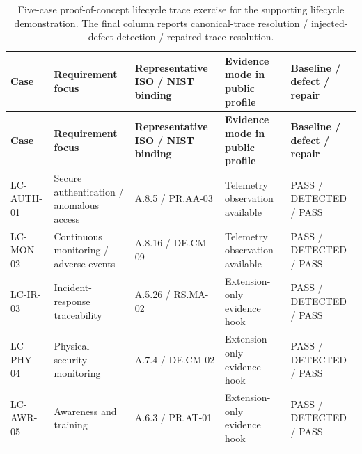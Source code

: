 \begingroup
\scriptsize
\setlength{\tabcolsep}{2.1pt}
\renewcommand{\arraystretch}{1.08}
\begin{longtable}{>{\raggedright\arraybackslash}p{1.7cm}>{\raggedright\arraybackslash}p{3.0cm}>{\raggedright\arraybackslash}p{2.3cm}>{\raggedright\arraybackslash}p{3.3cm}>{\raggedright\arraybackslash}p{2.5cm}}
\caption{Five-case proof-of-concept lifecycle trace exercise for the supporting lifecycle demonstration. The final column reports canonical-trace resolution / injected-defect detection / repaired-trace resolution.}
\label{tab:lifecycle-multicase}\\
\toprule
\textbf{Case} & \textbf{Requirement focus} & \textbf{Representative ISO / NIST binding} & \textbf{Evidence mode in public profile} & \textbf{Baseline / defect / repair}\\
\midrule
\endfirsthead
\toprule
\textbf{Case} & \textbf{Requirement focus} & \textbf{Representative ISO / NIST binding} & \textbf{Evidence mode in public profile} & \textbf{Baseline / defect / repair}\\
\midrule
\endhead
\bottomrule
\endlastfoot
LC-AUTH-01 & Secure authentication / anomalous access & A.8.5 / PR.AA-03 & Telemetry observation available & PASS / DETECTED / PASS\\
LC-MON-02 & Continuous monitoring / adverse events & A.8.16 / DE.CM-09 & Telemetry observation available & PASS / DETECTED / PASS\\
LC-IR-03 & Incident-response traceability & A.5.26 / RS.MA-02 & Extension-only evidence hook & PASS / DETECTED / PASS\\
LC-PHY-04 & Physical security monitoring & A.7.4 / DE.CM-02 & Extension-only evidence hook & PASS / DETECTED / PASS\\
LC-AWR-05 & Awareness and training & A.6.3 / PR.AT-01 & Extension-only evidence hook & PASS / DETECTED / PASS\\
\end{longtable}
\endgroup
